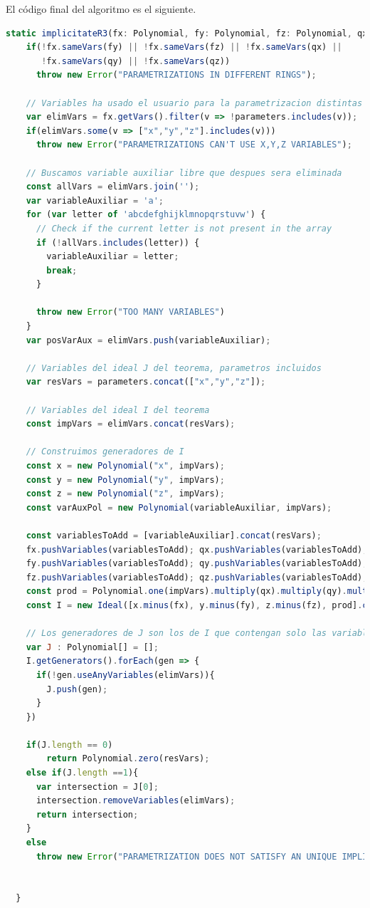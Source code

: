 El código final del algoritmo es el siguiente.
\begin{lstlisting}[language=JavaScript, caption=Algoritmo de implicitación]
static implicitateR3(fx: Polynomial, fy: Polynomial, fz: Polynomial, qx: Polynomial, qy: Polynomial, qz: Polynomial, parameters: string[] = []){
    if(!fx.sameVars(fy) || !fx.sameVars(fz) || !fx.sameVars(qx) || 
       !fx.sameVars(qy) || !fx.sameVars(qz))
      throw new Error("PARAMETRIZATIONS IN DIFFERENT RINGS");

    // Variables ha usado el usuario para la parametrizacion distintas a x,y,z
    var elimVars = fx.getVars().filter(v => !parameters.includes(v));
    if(elimVars.some(v => ["x","y","z"].includes(v)))
      throw new Error("PARAMETRIZATIONS CAN'T USE X,Y,Z VARIABLES");

    // Buscamos variable auxiliar libre que despues sera eliminada
    const allVars = elimVars.join('');
    var variableAuxiliar = 'a';
    for (var letter of 'abcdefghijklmnopqrstuvw') {
      // Check if the current letter is not present in the array
      if (!allVars.includes(letter)) {
        variableAuxiliar = letter;
        break;
      }

      throw new Error("TOO MANY VARIABLES")
    }
    var posVarAux = elimVars.push(variableAuxiliar);
   
    // Variables del ideal J del teorema, parametros incluidos
    var resVars = parameters.concat(["x","y","z"]);

    // Variables del ideal I del teorema
    const impVars = elimVars.concat(resVars);

    // Construimos generadores de I
    const x = new Polynomial("x", impVars);
    const y = new Polynomial("y", impVars);
    const z = new Polynomial("z", impVars);
    const varAuxPol = new Polynomial(variableAuxiliar, impVars);

    const variablesToAdd = [variableAuxiliar].concat(resVars);
    fx.pushVariables(variablesToAdd); qx.pushVariables(variablesToAdd);
    fy.pushVariables(variablesToAdd); qy.pushVariables(variablesToAdd);
    fz.pushVariables(variablesToAdd); qz.pushVariables(variablesToAdd);
    const prod = Polynomial.one(impVars).multiply(qx).multiply(qy).multiply(qz).multiply(varAuxPol);
    const I = new Ideal([x.minus(fx), y.minus(fy), z.minus(fz), prod].concat());

    // Los generadores de J son los de I que contengan solo las variables de resVars
    var J : Polynomial[] = [];
    I.getGenerators().forEach(gen => {
      if(!gen.useAnyVariables(elimVars)){
        J.push(gen);
      }
    })

    if(J.length == 0)   
        return Polynomial.zero(resVars);
    else if(J.length ==1){
      var intersection = J[0];
      intersection.removeVariables(elimVars);
      return intersection;
    }
    else
      throw new Error("PARAMETRIZATION DOES NOT SATISFY AN UNIQUE IMPLICIT EQUATION");
    

  }
\end{lstlisting}








